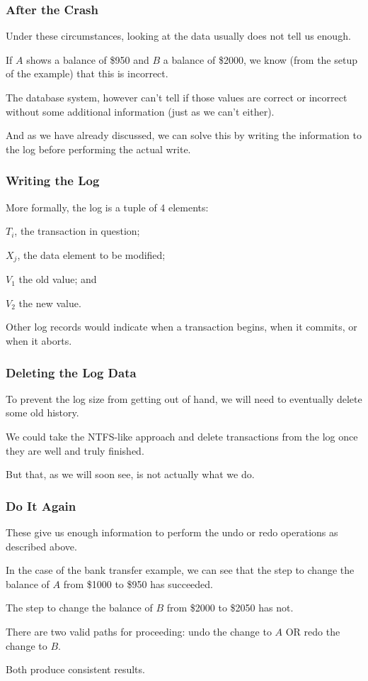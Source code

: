 \begin{frame}
\frametitle{After the Crash}

Under these circumstances, looking at the data usually does not tell us enough. 

If $A$ shows a balance of \$950 and $B$ a balance of \$2000, we know (from the setup of the example) that this is incorrect. 

The database system, however can't tell if those values are correct or incorrect without some additional information (just as we can't either). 

And as we have already discussed, we can solve this by writing the information to the log before performing the actual write.

\end{frame}

\begin{frame}
\frametitle{Writing the Log}
More formally, the log is a tuple of 4 elements: 

$T_{i}$, the transaction in question; 

$X_{j}$, the data element to be modified; 

$V_{1}$ the old value; and 

$V_{2}$ the new value. 

Other log records would indicate when a transaction begins, when it commits, or when it aborts. 

\end{frame}

\begin{frame}
\frametitle{Deleting the Log Data}

To prevent the log size from getting out of hand, we will need to eventually delete some old history. 

We could take the NTFS-like approach and delete transactions from the log once they are well and truly finished. 

But that, as we will soon see, is not actually what we do. 

\end{frame}

\begin{frame}
\frametitle{Do It Again}

These give us enough information to perform the undo or redo operations as described above. 

In the case of the bank transfer example, we can see that the step to change the balance of $A$ from \$1000 to \$950 has succeeded. 

The step to change the balance of $B$ from \$2000 to \$2050 has not. 

There are two valid paths for proceeding: undo the change to $A$ OR redo the change to $B$. 

Both produce consistent results.


\end{frame}


